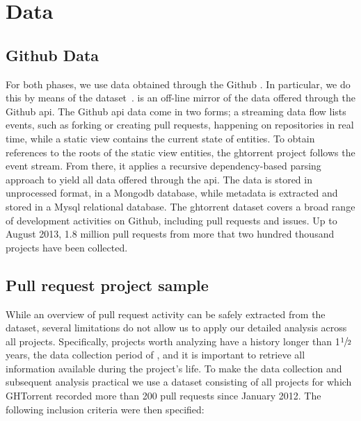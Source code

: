 \documentclass{sig-alternate}
\begin{document}
\section{Data}

\subsection{Github Data}

For both phases, we use data obtained through the Github \api.
In particular, we do this by means of the \ghtorrent
dataset~\cite{GS12}.
%
\ghtorrent is  an off-line mirror of the data
offered through the Github {\sc api}. The Github {\sc api} 
data come in two forms; a streaming
data flow lists events, such as forking or creating pull requests, happening on
repositories in real time, while a static view contains the current state of
entities. To obtain references to the roots of the static view entities, the
{\sc ght}orrent project follows the event stream. From there, it applies a
recursive dependency-based parsing approach to yield all data offered through
the {\sc api}. The data is stored in unprocessed format, in a Mongo{\sc db}
database, while metadata is extracted and stored in a My{\sc sql} relational
database. The {\sc ght}orrent dataset covers a broad range of development
activities on Github, including pull requests and issues. Up to August 2013,
1.8 million pull requests from more that two hundred thousand projects
have been collected.

\subsection{Pull request project sample}

\label{sec:expdata} 

While an overview of pull request activity can be safely extracted from the \ghtorrent dataset, several limitations do not allow us to apply our detailed
analysis across all projects. Specifically, projects worth analyzing have a
history longer than 1$\sfrac{1}{2}$ years, the data collection period of \ghtorrent, and it is important to retrieve all information
available during the project's life. To make the data collection and subsequent
analysis practical we use a dataset consisting of all projects for which
GHTorrent recorded more than 200 pull requests since January 2012. The
following inclusion criteria were then specified:
\end{document}
